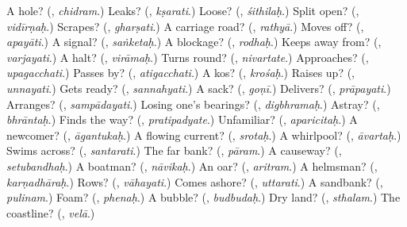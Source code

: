 \begin{tcolorbox}[breakable,colback=teal!4,colframe=teal!35!black,title={Before you move on}]
A hole? (\textbf{}, \emph{chidram}.) Leaks? (\textbf{}, \emph{kṣarati}.) Loose? (\textbf{}, \emph{śithilaḥ}.) Split open? (\textbf{}, \emph{vidīrṇaḥ}.) Scrapes? (\textbf{}, \emph{gharṣati}.) A carriage road? (\textbf{}, \emph{rathyā}.) Moves off? (\textbf{}, \emph{apayāti}.) A signal? (\textbf{}, \emph{saṅketaḥ}.) A blockage? (\textbf{}, \emph{rodhaḥ}.) Keeps away from? (\textbf{}, \emph{varjayati}.) A halt? (\textbf{}, \emph{virāmaḥ}.) Turns round? (\textbf{}, \emph{nivartate}.) Approaches? (\textbf{}, \emph{upagacchati}.) Passes by? (\textbf{}, \emph{atigacchati}.) A kos? (\textbf{}, \emph{krośaḥ}.) Raises up? (\textbf{}, \emph{unnayati}.) Gets ready? (\textbf{}, \emph{sannahyati}.) A sack? (\textbf{}, \emph{goṇī}.) Delivers? (\textbf{}, \emph{prāpayati}.) Arranges? (\textbf{}, \emph{sampādayati}.) Losing one's bearings? (\textbf{}, \emph{digbhramaḥ}.) Astray? (\textbf{}, \emph{bhrāntaḥ}.) Finds the way? (\textbf{}, \emph{pratipadyate}.) Unfamiliar? (\textbf{}, \emph{aparicitaḥ}.) A newcomer? (\textbf{}, \emph{āgantukaḥ}.) A flowing current? (\textbf{}, \emph{srotaḥ}.) A whirlpool? (\textbf{}, \emph{āvartaḥ}.) Swims across? (\textbf{}, \emph{santarati}.) The far bank? (\textbf{}, \emph{pāram}.) A causeway? (\textbf{}, \emph{setubandhaḥ}.) A boatman? (\textbf{}, \emph{nāvikaḥ}.) An oar? (\textbf{}, \emph{aritram}.) A helmsman? (\textbf{}, \emph{karṇadhāraḥ}.) Rows? (\textbf{}, \emph{vāhayati}.) Comes ashore? (\textbf{}, \emph{uttarati}.) A sandbank? (\textbf{}, \emph{pulinam}.) Foam? (\textbf{}, \emph{phenaḥ}.) A bubble? (\textbf{}, \emph{budbudaḥ}.) Dry land? (\textbf{}, \emph{sthalam}.) The coastline? (\textbf{}, \emph{velā}.)
\end{tcolorbox}
